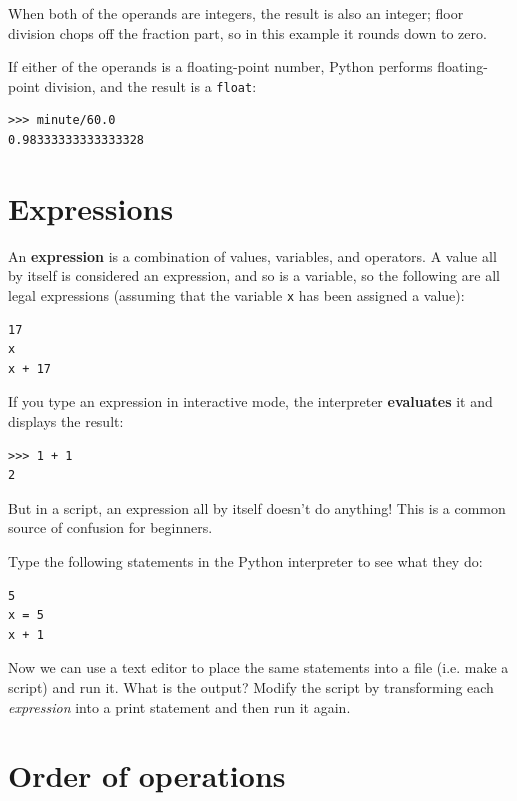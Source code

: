 \documentclass[10pt]{book}
\begin{document}

When both of the operands are integers, the result is also an
integer; floor division chops off the fraction
part, so in this example it rounds down to zero.

If either of the operands is a floating-point number, Python performs
floating-point division, and the result is a {\tt float}:

\beforeverb
\begin{verbatim}
>>> minute/60.0
0.98333333333333328
\end{verbatim}
\afterverb


\section{Expressions}

An {\bf expression} is a combination of values, variables, and operators.
A value all by itself is considered an expression, and so is
a variable, so the following are all legal expressions
(assuming that the variable {\tt x} has been assigned a value):


\beforeverb
\begin{verbatim}
17
x
x + 17
\end{verbatim}
\afterverb
%
If you type an expression in interactive mode, the interpreter
{\bf evaluates} it and displays the result:

\beforeverb
\begin{verbatim}
>>> 1 + 1
2
\end{verbatim}
\afterverb
%
But in a script, an expression all by itself doesn't
do anything!  This is a common
source of confusion for beginners.

\begin{ex}
Type the following statements in the Python interpreter to see
what they do:

\beforeverb
\begin{verbatim}
5
x = 5
x + 1
\end{verbatim}
\afterverb
%
Now we can use a text editor to place the same statements 
into a file (i.e. make a script) and run it.  What
is the output?  Modify the script by transforming each
{\em expression} into a print statement and then run it again.
\end{ex}


\section{Order of operations}
\end{document}
